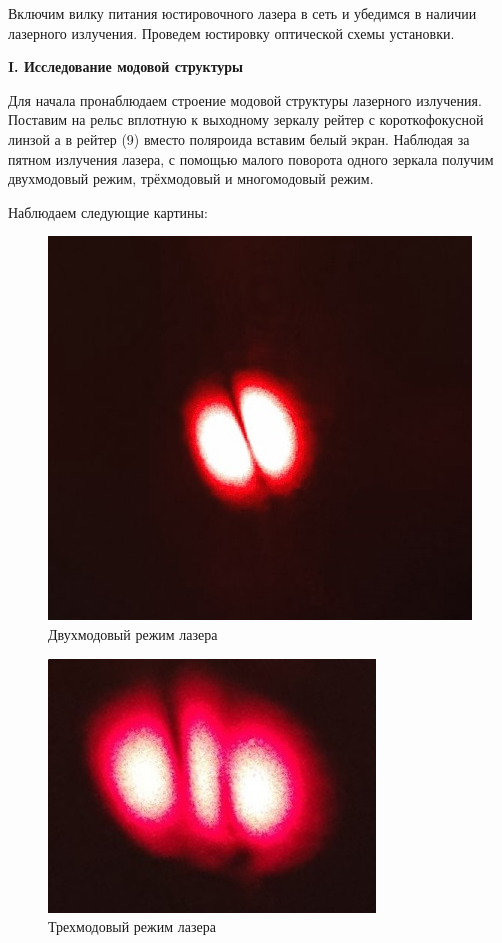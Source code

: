 \documentclass[a4paper,12pt]{article} %
\begin{document}
	Включим вилку питания юстировочного лазера в сеть и убедимся в наличии лазерного излучения. Проведем юстировку оптической схемы установки.
	
	\begin{center}
		\textbf{I. Исследование модовой структуры}
	\end{center}
	
	Для начала пронаблюдаем строение модовой структуры лазерного излучения. Поставим на рельс вплотную к выходному зеркалу рейтер с короткофокусной линзой а в рейтер (9) вместо поляроида вставим белый экран. Наблюдая за пятном излучения лазера, с помощью малого поворота одного зеркала получим двухмодовый режим, трёхмодовый и многомодовый режим.
	
	Наблюдаем следующие картины:
	
	\begin{figure}[h!]
		\centering
		\includegraphics[scale=1.2]{Pictures/Двухмодовый}
		\caption{Двухмодовый режим лазера}
	\end{figure}

	\newpage
	
	\begin{figure}[h!]
		\centering
		\includegraphics[scale=1.9]{Pictures/Трехмодовый}
		\caption{Трехмодовый режим лазера}
	\end{figure}
\end{document}
